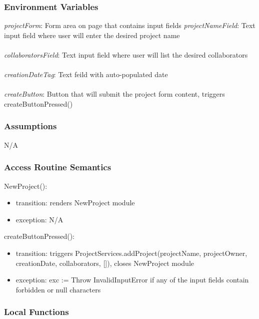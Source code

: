 \documentclass[12pt, titlepage]{article}
\begin{document}
	\subsubsection{Environment Variables}
	\textit{projectForm}: Form area on page that contains input fields
	\textit{projectNameField}: Text input field where user will enter the desired project name \\\\ 
	\textit{collaboratorsField}: Text input field where user will list the desired collaborators\\\\
	\textit{creationDateTag}: Text feild with auto-populated date \\\\
	\textit{createButton}: Button that will submit the project form content, triggers createButtonPressed()
	
	\subsubsection{Assumptions}
	N/A
	
	\subsubsection{Access Routine Semantics}
	
	\noindent NewProject():
	\begin{itemize}
		\item transition: renders NewProject module
		\item exception: N/A
	\end{itemize}
	
	\noindent createButtonPressed():
	\begin{itemize}
		\item transition: triggers ProjectServices.addProject(projectName, projectOwner, creationDate, collaborators, []), closes NewProject module
		\item exception: exc := Throw InvalidInputError if any of the input fields contain forbidden or null characters
	\end{itemize}
	
	\subsubsection{Local Functions}
	
\end{document}
